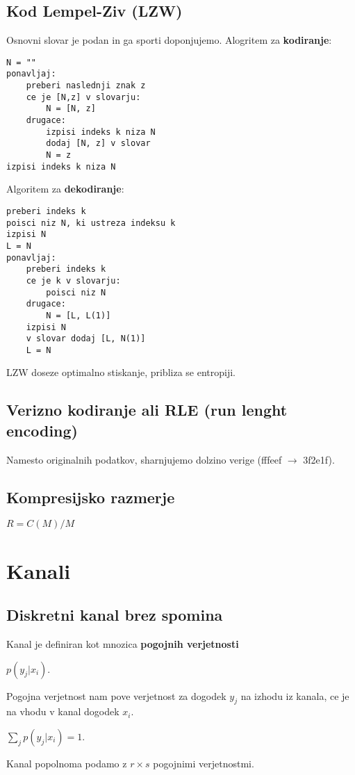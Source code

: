 \documentclass{article}
\begin{document}
\begin{multicols}{4}
\subsection{Kod Lempel-Ziv (LZW)}
Osnovni slovar je podan in ga sporti doponjujemo. Alogritem za \textbf{kodiranje}:
\begin{verbatim}
N = ""
ponavljaj:
    preberi naslednji znak z
    ce je [N,z] v slovarju:
        N = [N, z]
    drugace:
        izpisi indeks k niza N
        dodaj [N, z] v slovar
        N = z
izpisi indeks k niza N
\end{verbatim}
Algoritem za \textbf{dekodiranje}:
\begin{verbatim}
preberi indeks k
poisci niz N, ki ustreza indeksu k
izpisi N
L = N
ponavljaj:
    preberi indeks k
    ce je k v slovarju:
        poisci niz N
    drugace:
        N = [L, L(1)]
    izpisi N
    v slovar dodaj [L, N(1)]
    L = N
\end{verbatim}
LZW doseze optimalno stiskanje, pribliza se entropiji. %

\subsection{Verizno kodiranje ali RLE (run lenght encoding)} 
Namesto originalnih podatkov, sharnjujemo dolzino verige (fffeef $\rightarrow$ 3f2e1f).

\subsection{Kompresijsko razmerje}
\begin{center}
    \begin{math}
        R = C(M) / M
    \end{math}
\end{center}

\section{Kanali}

\subsection{Diskretni kanal brez spomina}
Kanal je definiran kot mnozica \textbf{pogojnih verjetnosti}
\begin{center}
    $p(y_j | x_i)$.
\end{center}
Pogojna verjetnost nam pove verjetnost za dogodek $y_j$ na izhodu iz kanala, ce je na vhodu v kanal dogodek $x_i$.
\begin{center}
    \begin{math}
        \sum_j p(y_j | x_i) = 1.
    \end{math} 
\end{center}
Kanal popolnoma podamo z $r \times s$ pogojnimi verjetnostmi.


\end{multicols}
\end{document}
